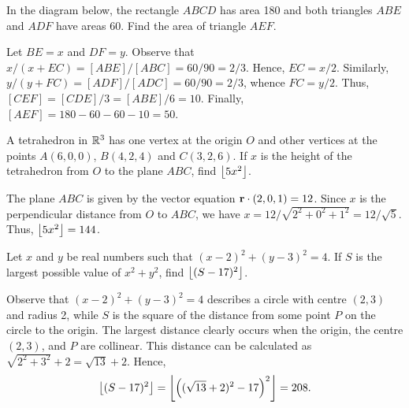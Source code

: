 \begin{question}[50]\label{Q::2022-O-1-6}
    In the diagram below, the rectangle $ABCD$ has area 180 and both triangles $ABE$ and $ADF$ have areas 60. Find the area of triangle $AEF$.

    \begin{center}
    \end{center}
\end{question}
\begin{solution*}
    Let $BE = x$ and $DF = y$. Observe that $x/(x+EC) = [ABE]/[ABC] = 60/90 = 2/3$. Hence, $EC = x/2$. Similarly, $y/(y+FC) = [ADF]/[ADC] = 60/90 = 2/3$, whence $FC = y/2$. Thus, $[CEF] = [CDE]/3 = [ABE]/6 = 10$. Finally, $[AEF] = 180 - 60 - 60 - 10 = 50$.
\end{solution*}

\begin{question}[144]\label{Q::2022-O-1-7}
    A tetrahedron in $\mathbb{R}^3$ has one vertex at the origin $O$ and other vertices at the points $A(6, 0, 0)$, $B(4, 2, 4)$ and $C(3, 2, 6)$. If $x$ is the height of the tetrahedron from $O$ to the plane $ABC$, find $\left\lfloor 5x^2 \right\rfloor$.
\end{question}
\begin{solution*}
    The plane $ABC$ is given by the vector equation $\mathbf{r} \cdot (2, 0, 1) = 12$. Since $x$ is the perpendicular distance from $O$ to $ABC$, we have $x = 12/{\sqrt{2^2 + 0^2 + 1^2}} = 12/\sqrt5$. Thus, $\left\lfloor 5x^2 \right\rfloor = 144$.
\end{solution*}

\begin{question}[208]\label{Q::2022-O-1-8}
    Let $x$ and $y$ be real numbers such that $(x-2)^2 + (y-3)^2 = 4$. If $S$ is the largest possible value of $x^2 + y^2$, find $\left\lfloor (S-17)^2 \right\rfloor$.
\end{question}
\begin{solution*}
    Observe that $(x-2)^2 + (y-3)^2 = 4$ describes a circle with centre $(2, 3)$ and radius 2, while $S$ is the square of the distance from some point $P$ on the circle to the origin. The largest distance clearly occurs when the origin, the centre $(2, 3)$, and $P$ are collinear. This distance can be calculated as $\sqrt{2^2 + 3^2} + 2 = \sqrt{13} + 2$. Hence, \[\left\lfloor (S-17)^2 \right\rfloor = \left\lfloor \left( (\sqrt{13} + 2)^2 - 17 \right)^2 \right\rfloor = 208.\]
\end{solution*}

